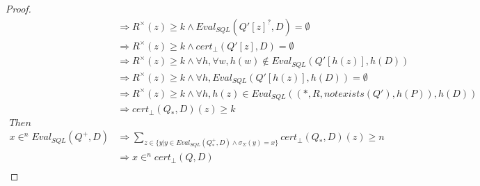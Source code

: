 \begin{proof}
\begin{align*}
		& \Rightarrow R^\times(z) \geq k \land Eval_{SQL}(Q'[z]^?,D) = \emptyset \\
		& \Rightarrow R^\times(z) \geq k \land cert_\bot(Q'[z],D) = \emptyset \\
		& \Rightarrow R^\times(z) \geq k \land \forall h, \forall w, h(w) \notin Eval_{SQL}(Q'[h(z)],h(D)) \\
		& \Rightarrow R^\times(z) \geq k \land \forall h , Eval_{SQL}(Q'[h(z)],h(D)) = \emptyset \\
		& \Rightarrow R^\times(z) \geq k \land \forall h, h(z) \in Eval_{SQL}((*,R,notexists(Q'),h(P)),h(D)) \\
		& \Rightarrow cert_\bot(Q_*,D)(z) \geq k \\
		Then \\
		x \in^n Eval_{SQL}(Q^+,D) & \Rightarrow \sum_{z \in \{y | y \in Eval_{SQL}(Q_*^+,D) \land \sigma_\Sigma(y) = x \} }{cert_\bot(Q_*,D)(z)} \geq n  \\
		& \Rightarrow x \in^n cert_\bot(Q,D) \\
	\end{align*}
\end{proof}

